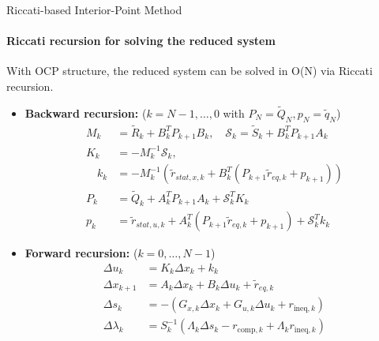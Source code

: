\documentclass[10pt,aspectratio=1610]{beamer} %
\begin{document}
\begin{frame}{Riccati-based Interior-Point Method}
    \framesubtitle{Riccati recursion for solving the reduced system}
	With OCP structure, the reduced system can be solved in O(N) via Riccati recursion.
	\begin{itemize}
        \item \textbf{Backward recursion:} ($k = N-1, \dots, 0$ with $P_N = \tilde{Q}_N, p_N = \tilde{q}_N$)
        \begin{equation*}
            \begin{aligned}
                M_k &= \tilde{R}_k + B_k^T P_{k+1} B_k, \quad \mathcal{S}_k = \tilde{S}_k + B_k^T P_{k+1} A_k \\
                K_k &= -M_k^{-1} \mathcal{S}_k, \\
				\quad k_k &= -M_k^{-1} (\tilde{r}_{stat, x, k} + B_k^T (P_{k+1} \tilde{r}_{eq, k} + p_{k+1})) \\
                P_k &= \tilde{Q}_k + A_k^T P_{k+1} A_k + \mathcal{S}_k^T K_k \\
                p_k &= \tilde{r}_{stat, u, k} + A_k^T (P_{k+1} \tilde{r}_{eq, k} + p_{k+1}) + \mathcal{S}_k^T k_k
            \end{aligned}
	\end{equation*}
		\item \textbf{Forward recursion:} ($k = 0, \dots, N-1$)
        \begin{equation*}
            \begin{aligned}
                \Delta u_k &= K_k \Delta x_k + k_k \\
                \Delta x_{k+1} &= A_k \Delta x_k + B_k \Delta u_k + \tilde{r}_{eq,k} \\
				\Delta s_k &= -(G_{x,k} \Delta x_k + G_{u,k} \Delta u_k + r_{\text{ineq},k}) \\
				\Delta \lambda_k &= S_k^{-1} (\Lambda_k \Delta s_k - r_{\text{comp},k} + \Lambda_k r_{\text{ineq},k})
            \end{aligned}
        \end{equation*}
	\end{itemize}
\end{frame}
\end{document}
